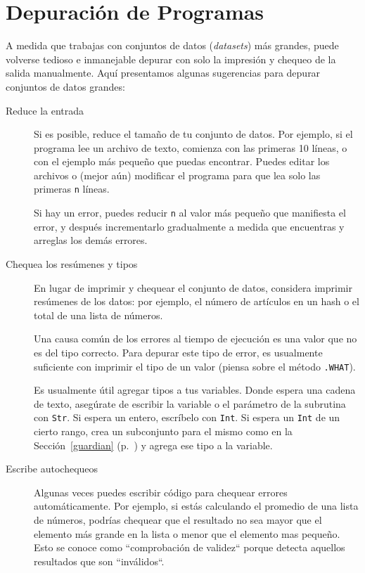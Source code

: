 \section{Depuración de Programas}

A medida que trabajas con conjuntos de datos (\emph{datasets}) más grandes,
puede volverse tedioso e inmanejable depurar con solo la impresión y chequeo
de la salida manualmente. Aquí presentamos algunas sugerencias para depurar
conjuntos de datos grandes:

\begin{description}

\item[Reduce la entrada] Si es posible, reduce el tamaño de
tu conjunto de datos. Por ejemplo, si el programa
lee un archivo de texto, comienza con las primeras 10 líneas, o con
el ejemplo más pequeño que puedas encontrar. Puedes editar los archivos
o (mejor aún) modificar el programa para que lea solo las primeras {\tt n}
líneas.

Si hay un error, puedes reducir {\tt n} al valor más pequeño que manifiesta
el error, y después incrementarlo gradualmente a medida que encuentras
y arreglas los demás errores.

\item[Chequea los resúmenes y tipos] En lugar de imprimir y chequear el conjunto
de datos, considera imprimir resúmenes de los datos: por ejemplo,
el número de artículos en un hash o el total de una lista de 
números.

Una causa común de los errores al tiempo de ejecución es una valor 
que no es del tipo correcto. Para depurar este tipo de error, es 
usualmente suficiente con imprimir el tipo de un valor (piensa sobre
el método {\tt .WHAT}).

Es usualmente útil agregar tipos a tus variables. Donde espera una
cadena de texto, asegúrate de escribir la variable o el parámetro 
de la subrutina con {\tt Str}. Si espera un entero, escríbelo 
con {\tt Int}. Si espera un {\tt Int} de un cierto rango, 
crea un subconjunto para el mismo como en la Sección~\ref{guardian} (p.~\pageref{guardian}) 
y agrega ese tipo a la variable.

\item[Escribe autochequeos]  Algunas veces puedes escribir código para
chequear errores automáticamente. Por ejemplo, si estás calculando
el promedio de una lista de números, podrías chequear que el 
resultado no sea mayor que el elemento más grande en la lista o menor
que el elemento mas pequeño. Esto se conoce como ``comprobación de
validez`` porque detecta aquellos resultados que son ``inválidos``.


\end{description}
